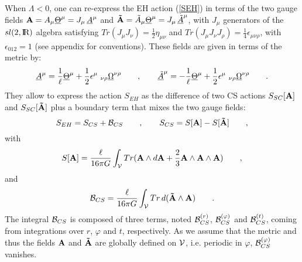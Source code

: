 \documentclass[a4paper,10pt]{article}
\begin{document}
When $\Lambda <0$, one can re-express \cite{ATW} the EH action (\ref{SEH})  
in terms of 
the two gauge fields  
${\bf A}=A_\mu {\underline \Theta} ^\mu = J_{ \mu} \, \underline {A}^{ \mu}$ 
and 
${\bf \tilde A}=\tilde A_\mu {\underline \Theta} ^\mu = J_{ \mu} \,  
\underline {\tilde A}^{ \mu}$,  
with $J_{ \mu}$ 
generators of the $sl(2,{\hbox{{\rm I}\kern-.2em\hbox{\rm R}}})$ algebra satisfying  
$Tr(J_\mu J_\nu)=\frac 1 2 \eta_{\mu\nu}$ and  
$Tr(J_\mu J_\nu J_\rho)=\frac 1 4 \epsilon_{\mu\nu\rho}$,  
with $\epsilon _{012}=1$ (see appendix for conventions).  
These fields are given in terms of the metric by: 
\begin{equation} 
\label{ATHOM} 
\underline{A}^{ \mu} = \frac 1 \ell \underline{\Theta}^{ \mu} + 
{1\over 2} \epsilon^{ \mu}\ _{ 
\nu\rho} \underline{\Omega}^{ \nu  \rho}  \qquad , \qquad 
\underline{\tilde A}^{ \mu} = - \frac 1 \ell \underline{\Theta}^{ \mu} + 
{1\over 2} \epsilon^{ \mu}\ _{ 
\nu\rho} \underline{\Omega}^{ \nu  \rho} \qquad  . 
\end{equation} 
They allow to express the action $S_{EH}$ as the 
difference of two CS actions $S_{SC}[{\bf A}]$ and $S_{SC}[{\bf \tilde A}]$  
plus a boundary term that mixes the two gauge fields: 
\begin{equation} 
\label{SCS} 
S_{EH}= S_{CS} + {\cal B}_{CS} 
\qquad , \qquad
S_{CS}=S[{\bf A}] - S[{\bf \tilde A}] \qquad , 
\end{equation} 
with 
\begin{equation} 
\label{SA} 
S[{\bf A}] = \frac {\ell} {16 \pi G} \int_{\cal V} 
 Tr({\bf A}\wedge d{\bf A} + {2\over 3} {\bf 
  A}\wedge {\bf A} \wedge {\bf A}) \qquad , 
\end{equation} 
and  
\begin{equation} 
\label{BEHCS} 
{\cal B}_{CS}= 
\frac {\ell} {16 \pi G} 
\int_{\cal V} Tr \, d ( {\bf \tilde A}\wedge {\bf A}) \qquad . 
\end{equation} 
The integral ${\cal B}_{CS}$ is composed of three terms, 
noted ${\cal B}_{CS}^{(r)}$, ${\cal B}_{CS}^{(\varphi)}$ and 
${\cal B}_{CS}^{(t)}$, coming from integrations 
over $r$, $\varphi$ and $t$, respectively. As we assume that the  
metric and thus the fields ${\bf A}$ and ${\bf \tilde A}$ are  
globally defined on $\cal V$, i.e. periodic in $\varphi$,  
${\cal B}_{CS}^{(\varphi)}$ vanishes. 
 
\end{document}
